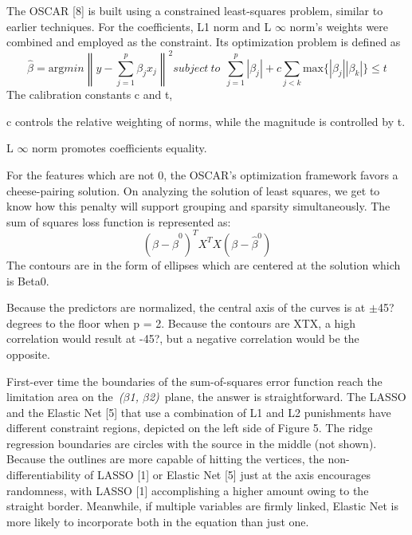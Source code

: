 \documentclass{article} %
\begin{document}
\noindent The OSCAR [8] is built using a constrained least-squares problem, similar to earlier techniques. For the coefficients, L1 norm and L $\mathrm{\infty}$ norm's weights were combined and employed as the constraint. Its optimization problem is defined as 
\begin{equation} \label{GrindEQ__13_} 
\widehat{\beta }={\mathrm{arg} min{\left\|y-\sum^p_{j=1}{{\beta }_jx_j}\right\|}^2subject\ to\ \ }\sum^p_{j=1}{\left|{\beta }_j\right|+c\sum_{j<k}{\mathrm{max}\mathrm{}\{\left|{\beta }_j\right|\left|{\beta }_k\right|\}\le t}} 
\end{equation} 
The calibration constants c and t,

\noindent c controls the relative weighting of norms, while the magnitude is controlled by t.

\noindent L $\mathrm{\infty}$ norm promotes coefficients equality.

\noindent For the features which are not 0, the OSCAR's optimization framework favors a cheese-pairing solution. On analyzing the solution of least squares, we get to know how this penalty will support grouping and sparsity simultaneously. The sum of squares loss function is represented as:
\begin{equation} \label{GrindEQ__14_} 
{\left(\beta -{\widehat{\beta }}^0\right)}^TX^TX\left(\beta -{\widehat{\beta }}^0\right) 
\end{equation} 
The contours are in the form of ellipses which are centered at the solution which is Beta0.

\noindent Because the predictors are normalized, the central axis of the curves is at $\mathrm{\pm}$45? degrees to the floor when p = 2. Because the contours are XTX, a high correlation would result at -45?, but a negative correlation would be the opposite.~

\noindent First-ever time the boundaries of the sum-of-squares error function reach the limitation area on the~\textit{($\beta$1, $\beta$2)}~plane, the answer is straightforward. The LASSO and the Elastic Net [5] that use a combination of L1 and L2 punishments have different constraint regions, depicted on the left side of Figure 5. The ridge regression boundaries are circles with the source in the middle (not shown). Because the outlines are more capable of hitting the vertices, the non-differentiability of LASSO [1] or Elastic Net [5] just at the axis encourages randomness, with LASSO [1] accomplishing a higher amount owing to the straight border. Meanwhile, if multiple variables are firmly linked, Elastic Net is more likely to incorporate both in the equation than just one.
\end{document}
